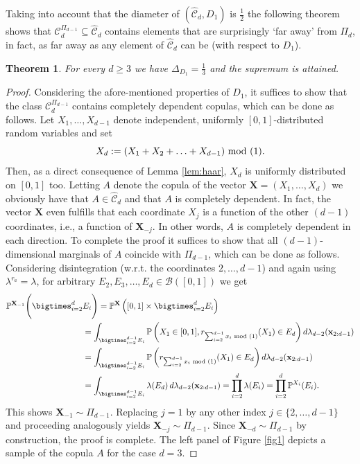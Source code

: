 \documentclass[12pt,a4paper]{amsart}
\newtheorem{theorem}{Theorem}[section]
\theoremstyle{definition}
\newcommand{\kc}{\mathcal{C}}
\begin{document}
Taking into account that the diameter of $(\hat{\kc}_d,D_1)$ is $\frac{1}{2}$ 
the following theorem shows that $\kc_d^{\Pi_{d-1}} \subseteq \hat{\kc}_d$ contains elements that 
are surprisingly `far away' from $\Pi_d$, in fact, as far away as any element of $\hat{\kc}_d$ can be (with respect to $D_1$).
\begin{theorem}\label{thm:mainD1}
For every $d \geq 3$ we have $\Delta_{D_1}=\frac{1}{3}$ and the supremum is attained.
\end{theorem}
\begin{proof}
    Considering the afore-mentioned properties of $D_1$, it suffices to show that the class 
    $ \kc_d^{\Pi_{d-1}}$ contains completely 
    dependent copulas, which can be done as follows.
    Let $X_1,\ldots,X_{d-1}$ denote independent, uniformly $[0,1]$-distributed random variables
    and set 
    \begin{equation}\label{eq:defX_q}
        X_d:= (X_1 + X_2 + \ldots + X_{d-1})  \,\, \textup{mod (1)}. 
    \end{equation}
    Then, as a direct consequence of Lemma \ref{lem:haar}, $X_d$ is uniformly distributed on 
    $[0,1]$ too. Letting $A$ denote the copula
    of the vector $\mathbf{X}=(X_1,\ldots,X_d)$ we obviously have that 
    $A \in \hat{\kc}_d$ and that $A$ is completely dependent. In fact, the vector 
    $\mathbf{X}$ even fulfills that each coordinate $X_j$ is a function of the other $(d-1)$ coordinates, i.e., a function of $\mathbf{X}_{-j}$. In other words, $A$ is completely 
    dependent in each direction.     
    To complete the proof it suffices to show that all $(d-1)$-dimensional marginals 
    of $A$ coincide with $\Pi_{d-1}$, which can be done as follows. 
    Considering disintegration (w.r.t. the coordinates $2,\ldots,d-1$) and again using  $\lambda^{r_a}=\lambda$,  
    for arbitrary $E_2,E_3,\ldots, E_d \in \mathcal{B}([0,1])$ we get
    \begin{align*}
        \mathbb{P}^{\mathbf{X}_{-1}} \Bigg(\bigtimes_{i=2}^d &E_i\Bigg) = 
        \mathbb{P}^{\mathbf{X}} \left([0,1] \times \bigtimes_{i=2}^d E_i\right) \\
        &= 
        \int_{\bigtimes_{i=2}^{d-1}E_i} \mathbb{P}\left(X_1 \in [0,1], r_{\sum_{i=2}^{d-1}x_i \,\, \textup{mod (1)}}(X_1) \in E_d \right)d\lambda_{d-2}(\mathbf{x}_{2:d-1}) \\
        &= \int_{\bigtimes_{i=2}^{d-1}E_i} \mathbb{P}\left(r_{\sum_{i=2}^{d-1}x_i \,\, \textup{mod (1)}}(X_1) \in E_d \right)d\lambda_{d-2}(\mathbf{x}_{2:d-1}) \\
        &= \int_{\bigtimes_{i=2}^{d-1}E_i} \lambda(E_d) \,d\lambda_{d-2}(\mathbf{x}_{2:d-1}) 
        = \prod_{i=2}^d \lambda(E_i) = \prod_{i=2}^d \mathbb{P}^{X_i}(E_i). 
        \end{align*}
    This shows $\mathbf{X}_{-1} \sim \Pi_{d-1}$. Replacing $j=1$ by any other index
    $j \in \{2,\ldots,d-1\}$ and proceeding analogously yields $\mathbf{X}_{-j} \sim \Pi_{d-1}$. 
    Since $\mathbf{X}_{-d} \sim \Pi_{d-1}$ by construction, the proof is complete. The left panel of Figure \ref{fig1} depicts a sample of the copula $A$ for 
    the case $d=3$. 
    \end{proof}
\end{document}
